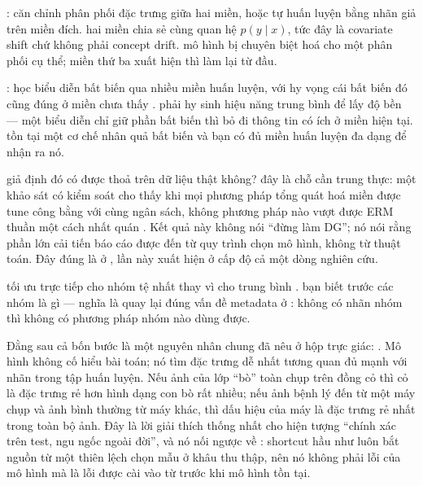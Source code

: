 \documentclass[../../deep_learning.tex]{subfiles}
\begin{document}
\begin{mach}
\item {} \gp {}: căn chỉnh phân phối đặc trưng giữa hai miền, hoặc tự huấn luyện bằng nhãn giả trên miền đích. \gd hai miền chia sẻ cùng quan hệ \(p(y \mid x)\), tức đây là covariate shift chứ không phải concept drift. \gia mô hình bị chuyên biệt hoá cho một phân phối cụ thể; miền thứ ba xuất hiện thì làm lại từ đầu.
\item {} \gp {}: học biểu diễn bất biến qua nhiều miền huấn luyện, với hy vọng cái bất biến đó cũng đúng ở miền chưa thấy \cite{arjovsky2019irm}. \gia phải hy sinh hiệu năng trung bình để lấy độ bền --- một biểu diễn chỉ giữ phần bất biến thì bỏ đi thông tin có ích ở miền hiện tại. \gd tồn tại một cơ chế nhân quả bất biến và bạn có đủ miền huấn luyện đa dạng để nhận ra nó.
\item \vdm giả định đó có được thoả trên dữ liệu thật không? \hq đây là chỗ cần trung thực: một khảo sát có kiểm soát cho thấy khi mọi phương pháp tổng quát hoá miền được tune công bằng với cùng ngân sách, không phương pháp nào vượt được ERM thuần một cách nhất quán \cite{gulrajani2021search}. Kết quả này không nói ``đừng làm DG''; nó nói rằng phần lớn cải tiến báo cáo được đến từ quy trình chọn mô hình, không từ thuật toán. Đây đúng là  ở , lần này xuất hiện ở cấp độ cả một dòng nghiên cứu.
\item {} \gp tối ưu trực tiếp cho nhóm tệ nhất thay vì cho trung bình \cite{sagawa2020groupdro}. \gd bạn biết trước các nhóm là gì --- nghĩa là quay lại đúng vấn đề metadata ở : không có nhãn nhóm thì không có phương pháp nhóm nào dùng được.
\end{mach}

Đằng sau cả bốn bước là một nguyên nhân chung đã nêu ở hộp trực giác:  \cite{geirhos2020shortcut}. Mô hình không cố hiểu bài toán; nó tìm đặc trưng dễ nhất tương quan đủ mạnh với nhãn trong tập huấn luyện. Nếu ảnh của lớp ``bò'' toàn chụp trên đồng cỏ thì cỏ là đặc trưng rẻ hơn hình dạng con bò rất nhiều; nếu ảnh bệnh lý đến từ một máy chụp và ảnh bình thường từ máy khác, thì dấu hiệu của máy là đặc trưng rẻ nhất trong toàn bộ ảnh. Đây là lời giải thích thống nhất cho hiện tượng ``chính xác trên test, ngu ngốc ngoài đời'', và nó nối ngược về : shortcut hầu như luôn bắt nguồn từ một thiên lệch chọn mẫu ở khâu thu thập, nên nó không phải lỗi của mô hình mà là lỗi được cài vào từ trước khi mô hình tồn tại.
\end{document}
